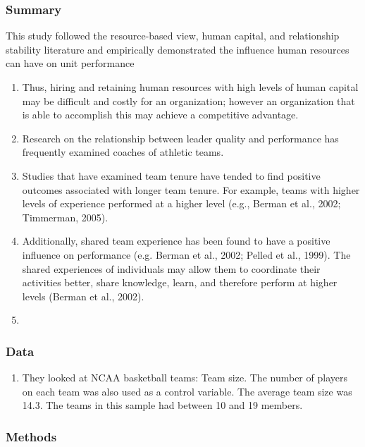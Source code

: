\documentclass[12pt]{article}
\begin{document}
\subsubsection*{Summary}

This study followed the resource-based view, human capital, and relationship stability literature and empirically demonstrated the influence human resources can have on unit performance

\begin{enumerate}
    \item Thus, hiring and retaining human resources with high levels of human capital may be difficult and costly for an organization; however an organization that is able to accomplish this may achieve a competitive advantage.
    \item Research on the relationship between leader quality and performance has frequently examined coaches of athletic teams.
    \item Studies that have examined team tenure have tended to find positive outcomes associated with longer team tenure. For example, teams with higher levels of experience performed at a higher level (e.g., Berman et al., 2002; Timmerman, 2005).
    \item Additionally, shared team experience has been found to have a positive influence on performance (e.g. Berman et al., 2002; Pelled et al., 1999). The shared experiences of individuals may allow them to coordinate their activities better, share knowledge, learn, and therefore perform at higher levels (Berman et al., 2002).
    \item 
\end{enumerate}

\subsubsection*{Data}

\begin{enumerate}
    \item They looked at NCAA basketball teams:  Team size. The number of players on each team was also used as a control variable. The average team size was 14.3. The teams in this sample had between 10 and 19 members.
\end{enumerate}

\subsubsection*{Methods}
\end{document}
